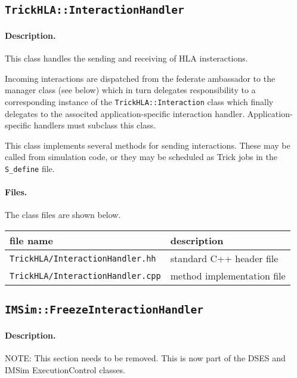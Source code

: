 \subsection{{\tt TrickHLA::InteractionHandler}}

\paragraph{Description.}
This class handles the sending and receiving of HLA insteractions.

Incoming interactions are dispatched from the federate ambassador
to the manager class (see below) which in turn delegates responsibility
to a corresponding instance of the {\tt TrickHLA::Interaction} class
which finally delegates to the associted application-specific
interaction handler.
Application-specific handlers must subclass this class.

This class implements several methods for sending interactions. 
These may be called from simulation code, or they may be scheduled as
Trick jobs in the {\tt S\_define} file.

\paragraph{Files.}
The class files are shown below.
   
{
  \scriptsize
  \begin{tabular}{|l|l|} 
    \hline
    file name & description \\
    \hline \hline
    {\tt TrickHLA/InteractionHandler.hh} 
    & standard C++ header file
    \\ \hline
    {\tt TrickHLA/InteractionHandler.cpp} 
    & method implementation file
    \\ \hline
  \end{tabular}
}

\subsection{{\tt IMSim::FreezeInteractionHandler}}

\paragraph{Description.}
NOTE: This section needs to be removed. This is now part of the DSES and
IMSim {\ttfamily ExecutionControl} classes.

